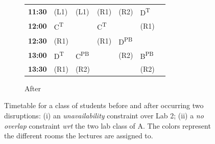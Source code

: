 \documentclass[runningheads]{llncs}
\begin{document}
\begin{figure}[t]
\begin{subfigure}{.5\textwidth}
{\begin{tabular}{|c||P{1.4cm}|P{1.4cm}|P{1.4cm}|P{1.4cm}|P{1.4cm}|p{0.4cm}}
\textbf{11:30}   &  (L1)                        &  (L1)                     &   (R1)                        &     (R2)                  &        D\textsuperscript{T}   &  \\ 
\textbf{12:00}   &  C\textsuperscript{T}        &                                                   &    C\textsuperscript{T}       &                           &   (R1)                        &      \\   
    \textbf{12:30}   &  (R1)                        &                       &     (R1)                      &    D\textsuperscript{PB}  &                               &    \\ 
\textbf{13:00}   &   D\textsuperscript{T}       &   C\textsuperscript{PB}   &                                                       &    (R2)                   &    B\textsuperscript{PB}      &    \\ 
\textbf{13:30}   &   (R1)                       &   (R2)                    &                                                       &                                                   &    (R2)                       &   \\ 
\end{tabular}}
\caption{After}
    \label{fig:after}
\end{subfigure}
\caption{Timetable for a class of students before and after occurring two disruptions: (i) an  \textit{unavailability} constraint over Lab 2; (ii)  a \textit{no overlap} constraint \textit{wrt} the two lab class of A. The colors represent the different rooms the lectures are assigned to.}
\label{fig:original}
\end{figure}
\end{document}
